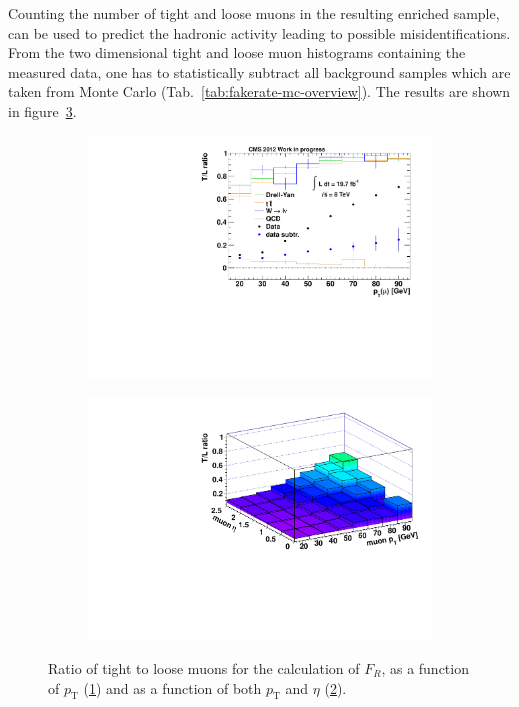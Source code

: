 Counting the number of tight and loose muons in the resulting enriched sample, can be used to predict the hadronic activity leading to possible misidentifications. From the two dimensional tight and loose muon histograms containing the measured data, one has to statistically subtract all background samples which are taken from Monte Carlo (Tab.~\ref{tab:fakerate-mc-overview}). The results are shown in figure~\ref{fig:tlratios}.
 
\begin{figure}[!htb]
  \centering
  \begin{subfigure}[b]{0.495\textwidth}
    \centering
    \includegraphics[width=\textwidth]{plots/tlratio.pdf}
    \caption{\label{fig:tlratio}}
  \end{subfigure}
  \begin{subfigure}[b]{0.495\textwidth}
    \centering
    \includegraphics[width=\textwidth]{plots/tlratio2d.pdf}
    \caption{\label{fig:tlratio2d}}
  \end{subfigure}

  \caption{Ratio of tight to loose muons for the calculation of $F_R$, as a function of $p_{\text{T}}$ (\ref{fig:tlratio}) and as a function of both $p_{\text{T}}$ and $\eta$ (\ref{fig:tlratio2d}).}
  \label{fig:tlratios}
\end{figure}


